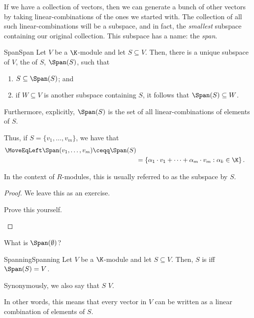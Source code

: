 If we have a collection of vectors, then we can generate a bunch of other vectors by taking linear-combinations of the ones we started with.  The collection of all such linear-combinations will be a subspace, and in fact, the \emph{smallest} subspace containing our original collection.  This subspace has a name:  the \emph{span}.
\begin{thm}{Span}{Span}
	Let $V$ be a $\K$-module and let $S\subseteq V$.  Then, there is a unique subspace of $V$, the  of $S$, $\Span (S)$, such that
	\begin{enumerate}
		\item $S\subseteq \Span (S)$; and
		\item if $W\subseteq V$ is another subspace containing $S$, it follows that $\Span (S)\subseteq W$.
	\end{enumerate}
	Furthermore, explicitly, $\Span (S)$ is the set of all linear-combinations of elements of $S$.
	\begin{rmk}
		Thus, if $S=\{ v_1,\ldots ,v_m\}$, we have that
		\begin{equation}
			\begin{split}
				\MoveEqLeft
				\Span (v_1,\ldots ,v_m)\ceqq \Span (S) \\
				& =\left\{ \alpha _1\cdot v_1+\cdots +\alpha _m\cdot v_m:\alpha _k\in \K \right\} .
			\end{split}
		\end{equation}
	\end{rmk}
	\begin{rmk}
		In the context of $R$-modules, this is usually referred to as the subspace  by $S$.
	\end{rmk}
	\begin{proof}
		We leave this as an exercise.
		\begin{exr}[breakable=false]{}{}
			Prove this yourself.
		\end{exr}
	\end{proof}
\end{thm}
\begin{exr}{}{}
	What is $\Span (\emptyset )$?
\end{exr}
\begin{dfn}{Spanning}{Spanning}
	Let $V$ be a $\K$-module and let $S\subseteq V$.  Then, $S$ is  iff $\Span (S)=V$.
	\begin{rmk}
		Synonymously, we also say that $S$  $V$.
	\end{rmk}
	\begin{rmk}
		In other words, this means that every vector in $V$ can be written as a linear combination of elements of $S$.
	\end{rmk}
\end{dfn}

